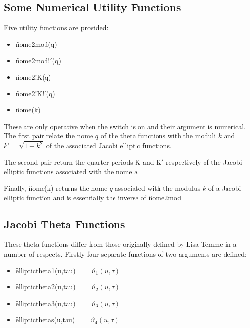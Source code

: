 \subsection{Some Numerical Utility Functions}
\hypertarget{operator:NOME}{}
\hypertarget{operator:NOME2K}{}
\hypertarget{operator:NOME2K'}{}
\hypertarget{operator:NOME2MOD}{}
\hypertarget{operator:NOME2MOD'}{}
\hypertarget{ELLIPNOME}{}

Five utility functions are provided:
\begin{itemize}
\item \f{nome2mod(q)}
\item \f{nome2mod!$'$(q)}
\item \f{nome2!K(q)}
\item \f{nome2!K!$'$(q)}
\item \f{nome(k)}
\end{itemize}

These are only operative when the switch  is on and their
argument is numerical. The first pair relate the nome $q$ of the theta
functions with the moduli $k$ and $k'=\sqrt{1-k^2}$ of the associated Jacobi
elliptic functions.

The second pair return the quarter periods K and K$'$ respectively of
the Jacobi elliptic functions associated with the nome $q$.

Finally, \f{nome(k)} returns the nome $q$ associated with the modulus $k$ of
a Jacobi elliptic function and is essentially the inverse of \f{nome2mod}.

\subsection{Jacobi Theta Functions}
\hypertarget{JACTF}{}
These theta functions differ from those originally defined by Lisa Temme
in a number of respects.
Firstly four separate functions of two arguments are defined:
\hypertarget{operator:ELLIPTICTHETA1}{}
\hypertarget{operator:ELLIPTICTHETA2}{}
\hypertarget{operator:ELLIPTICTHETA3}{}
\hypertarget{operator:ELLIPTICTHETA4}{}
 
 
\begin{itemize}
\item \f{elliptictheta1(u,tau)} $\qquad \vartheta_1(u, \tau)$
\item \f{elliptictheta2(u,tau)} $\qquad \vartheta_2(u, \tau)$
\item \f{elliptictheta3(u,tau)} $\qquad \vartheta_3(u, \tau)$
\item \f{ellipticthetas(u,tau)} $\qquad \vartheta_4(u, \tau)$
\end{itemize}

